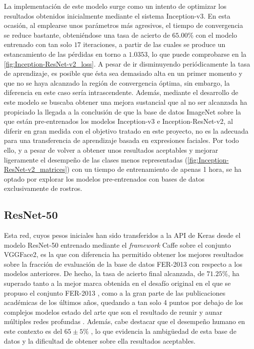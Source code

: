 La implementación de este modelo surge como un intento de optimizar los resultados obtenidos inicialmente mediante el sistema Inception-v3. En esta ocasión, al emplearse unos parámetros más agresivos, el tiempo de convergencia se reduce bastante, obteniéndose una tasa de acierto de $65.00\%$ con el modelo entrenado con tan solo $17$ iteraciones, a partir de las cuales se produce un estancamiento de las pérdidas en torno a $1.0353$, lo que puede comprobarse en la \autoref{fig:Inception-ResNet-v2_loss}. A pesar de ir disminuyendo periódicamente la tasa de aprendizaje, es posible que ésta sea demasiado alta en un primer momento y que no se haya alcanzado la región de convergencia óptima, sin embargo, la diferencia en este caso sería intrascendente. Además, mediante el desarrollo de este modelo se buscaba obtener una mejora sustancial que al no ser alcanzada ha propiciado la llegada a la conclusión de que la base de datos ImageNet sobre la que están pre-entrenados los modelos Inception-v3 e Inception-ResNet-v2, al diferir en gran medida con el objetivo tratado en este proyecto, no es la adecuada para una transferencia de aprendizaje basada en expresiones faciales. Por todo ello, y a pesar de volver a obtener unos resultados aceptables y mejorar ligeramente el desempeño de las clases menos representadas (\autoref{fig:Inception-ResNet-v2_matrices}) con un tiempo de entrenamiento de apenas 1 hora, se ha optado por explorar los modelos pre-entrenados con bases de datos exclusivamente de rostros.

\subsection{ResNet-50}

Esta red, cuyos pesos iniciales han sido transferidos a la API de Keras desde el modelo ResNet-50 entrenado mediante el \textit{framework} Caffe sobre el conjunto VGGFace2, es la que con diferencia ha permitido obtener los mejores resultados sobre la fracción de evaluación de la base de datos FER-2013 con respecto a los modelos anteriores. De hecho, la tasa de acierto final alcanzada, de $71.25\%$, ha superado tanto a la mejor marca obtenida en el desafío original en el que se propuso el conjunto FER-2013 \cite{FER-2013}, como a la gran parte de las publicaciones académicas de los últimos años, quedando a tan solo 4 puntos por debajo de los complejos modelos estado del arte que son el resultado de reunir y aunar múltiples redes profundas \cite{Pramerdorfer}. Además, cabe destacar que el desempeño humano en este contexto es del $65\pm 5\%$ \cite{FER-2013_human_acc}, lo que evidencia la ambigüedad de esta base de datos y la dificultad de obtener sobre ella resultados aceptables.

